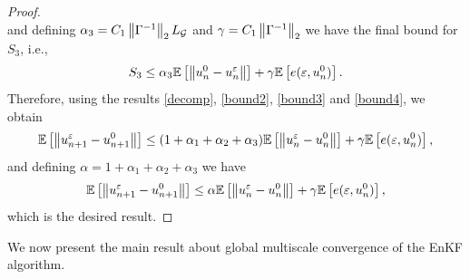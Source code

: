 \documentclass[10pt]{article}
\begin{document}
{\begin{proof}
\begin{equation*}
\end{equation*}
and defining $\alpha_3 = C_1 \left\|\Gamma^{-1}\right\|_2 L_{\mathcal{G}}$ and $\gamma = C_1 \left\|\Gamma^{-1}\right\|_2$ we have the final bound for $S_3$, i.e.,
\begin{equation}
\label{bound4}
S_3 \leq \alpha_3 \mathbb{E} \left [ \left\|u_n^0 - u_n^{\varepsilon}\right\| \right ] + \gamma \mathbb{E} \left [ e(\varepsilon, u_n^0) \right ].
\end{equation}
Therefore, using the results \eqref{decomp}, \eqref{bound2}, \eqref{bound3} and \eqref{bound4}, we obtain
\begin{equation*}
\mathbb{E} \left [ \left\|u_{n+1}^{\varepsilon} - u_{n+1}^0\right\| \right ] \le (1 + \alpha_1 + \alpha_2 + \alpha_3) \mathbb{E} \left [ \left\|u_n^{\varepsilon} - u_n^0\right\| \right ] + \gamma \mathbb{E} \left [ e(\varepsilon, u_n^0) \right ],
\end{equation*}
and defining $\alpha = 1 + \alpha_1 + \alpha_2 + \alpha_3$ we have
\begin{equation}
\label{induction}
\mathbb{E} \left [ \left\|u_{n+1}^{\varepsilon} - u_{n+1}^0\right\| \right ] \le \alpha \mathbb{E} \left [ \left\|u_n^{\varepsilon} - u_n^0\right\| \right ] + \gamma \mathbb{E} \left [ e(\varepsilon, u_n^0) \right ],
\end{equation}
which is the desired result.
\end{proof}
}

We now present the main result about global multiscale convergence of the EnKF algorithm.
\end{document}
